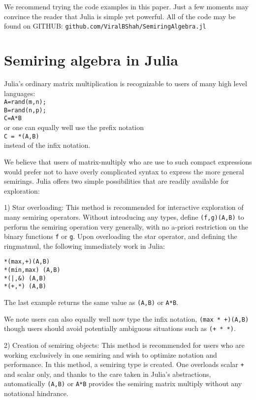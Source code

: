 \documentclass[conference]{IEEEtran}
\begin{document}
We recommend trying the code examples in this paper.  Just a few moments may
convince the reader that Julia is simple yet powerful.
All of the code may be found on GITHUB:
\verb+github.com/ViralBShah/SemiringAlgebra.jl+



\section{Semiring algebra in Julia}

Julia's ordinary matrix multiplication is recognizable to users of many
high level languages: \\
{\tt A=rand(m,n); \\  B=rand(n,p); \\ C=A*B } \\ 
or one can equally well use the prefix notation \\
{\tt C = *(A,B)} \\ 
instead of the infix notation.

We believe that users of matrix-multiply who are use 
to such compact expressions would prefer not to have 
overly complicated syntax to express the more general 
semirings.  Julia offers two simple possibilities that are readily
available for exploration: 

1) Star overloading:
This method is recommended for interactive exploration of many semiring operators. 
Without introducing any types, define  {\tt *(f,g)(A,B)} to 
perform the semiring operation very generally, with no a-priori restriction
on the binary functions {\tt f} or {\tt g}.   Upon overloading the star operator,
and defining the ringmatmul, the following immediately work in Julia:
\begin{verbatim}
*(max,+)(A,B)  
*(min,max) (A,B)  
*(|,&) (A,B)  
*(+,*) (A,B)
\end{verbatim}  
The last example returns the same value as {\tt *(A,B)} or {\tt A*B}.

We note users can also equally well now type the infix notation,
{\tt (max * +)(A,B) } though users should avoid potentially ambiguous situations such as
{\tt (+ * *)}.

2) Creation of semiring objects:  This method is recommended for users who are working exclusively in one semiring and wish to optimize notation and performance.  In this method,
a semiring type is created.  One overloads scalar {\tt +} and scalar {\tt *} only,
and thanks to the care taken in Julia's abstractions,  automatically 
{\tt *(A,B)} or {\tt A*B} provides the semiring matrix multiply without any notational
hindrance.
   
\end{document}
